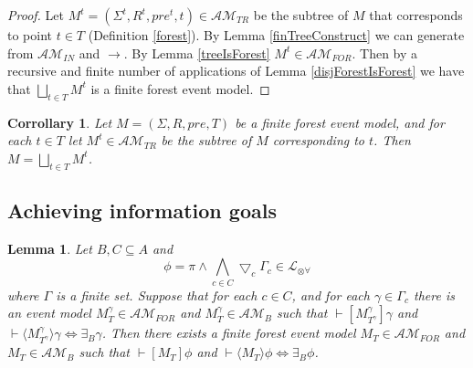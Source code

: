 \documentclass[12pt, a4paper, titlepage]{scrartcl}
\newtheorem{lemma}{Lemma}[subsection]
\newtheorem{corr}{Corrollary}[subsection]
\numberwithin{equation}{section}
\newcommand{\cover}{\bigtriangledown}
\newcommand{\sqex}[1]{[{#1}]}
\newcommand{\anex}[1]{\langle {#1} \rangle}
\newcommand{\lang}{\mathcal{L}}
\newcommand{\langArbAct}{\lang_{\otimes\forall}}
\newcommand{\eventClass}{\mathcal{AM}}
\newcommand{\insaneClass}{\eventClass_{IN}}
\newcommand{\treeClass}{\eventClass_{TR}}
\newcommand{\forestClass}{\eventClass_{FOR}}
\newcommand{\FIXME}{{\bf FIXME}}
\begin{document}
\begin{proof}
Let $M^t = (\Sigma^t, R^t, pre^t, t) \in \treeClass$ be the
subtree of $M$ that corresponds to point $t \in T$ (Definition \ref{forest}).
By Lemma \ref{finTreeConstruct} we can generate from $\insaneClass$ and $\to$.
By Lemma \ref{treeIsForest} $M^t \in \forestClass$.
Then by a recursive and finite number of applications of Lemma
\ref{disjForestIsForest} we have that $\bigsqcup_{t \in T} M^t$ is a finite
forest event model.
\end{proof}

\begin{corr} \label{forestConCorr}
Let $M = (\Sigma, R, pre, T)$ be a finite forest event model, and for each $t \in T$ let $M^t \in
\treeClass$ be the subtree of $M$ corresponding to $t$.
Then $M = \bigsqcup_{t \in T} M^t$.
\end{corr}

\subsection{Achieving information goals}


\begin{lemma} \label{coverFormulaAchievementK}
Let $B, C \subseteq A$ and
\[
\phi = \pi \land \bigwedge_{c \in C} \cover_c \Gamma_c \in \langArbAct
\]
where $\Gamma$ is a finite set.
Suppose that for each $c \in C$, and for each $\gamma \in \Gamma_c$ there is an event model
$M^\gamma_T \in \forestClass$ and $M^\gamma_T \in \eventClass_B$  such that
$\vdash \sqex{M^\gamma_{T^\gamma}} \gamma$ and $\vdash \anex{ M^\gamma_{T^\gamma} } \gamma \iff
\exists_B \gamma$.
Then there exists a finite forest event model $M_T \in \forestClass$ and $M_T \in \eventClass_B$
such that $\vdash \sqex{M_T}\phi$ and $\vdash \anex{ M_T } \phi \iff \exists_B \phi$.
\end{lemma}
\end{document}
